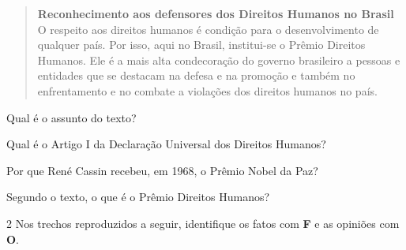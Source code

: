 \begin{conteudo}
\begin{conteudo}
\begin{conteudo}
\begin{conteudo}
\begin{quote}
\textbf{Reconhecimento aos defensores dos Direitos Humanos no Brasil}\\
O respeito aos direitos humanos é condição para o desenvolvimento de
qualquer país. Por isso, aqui no Brasil, institui-se o Prêmio Direitos
Humanos. Ele é a mais alta condecoração do governo brasileiro a pessoas
e entidades que se destacam na defesa e na promoção e também no
enfrentamento e no combate a violações dos direitos humanos no país.

\end{quote}

\pagebreak
\begin{escolha}
\item Qual é o assunto do texto?
\item{}

\item Qual é o Artigo I da Declaração Universal dos Direitos Humanos?
\item{}

\item Por que René Cassin recebeu, em 1968, o Prêmio Nobel da Paz?
\item{}

\item Segundo o texto, o que é o Prêmio Direitos Humanos?
\item{}
\end{escolha}

\num{2} Nos trechos reproduzidos a seguir, identifique os fatos com \textbf{F}
e as opiniões com \textbf{O}.



\end{conteudo}
\end{conteudo}
\end{conteudo}
\end{conteudo}
